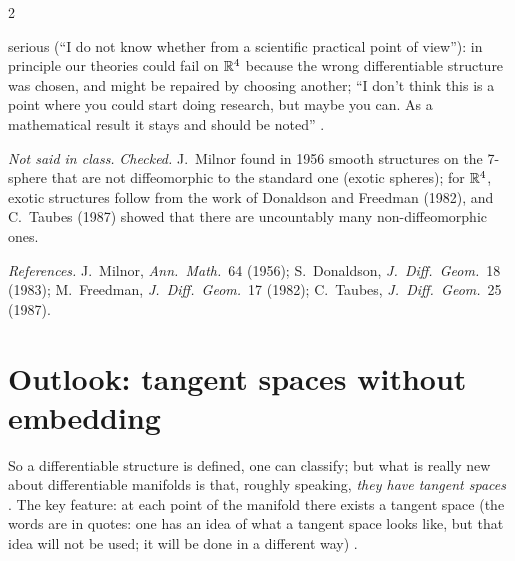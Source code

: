 \begin{paracol}{2}
\begin{application}
serious (``I do not know whether from a scientific practical point of view''): in principle our theories could fail on $\mathbb{R}^4$ because the wrong differentiable structure was chosen, and might be repaired by choosing another; ``I don't think this is a point where you could start doing research, but maybe you can. As a mathematical result it stays
and should be noted'' .
\end{application}
\begin{history}
\emph{Not said in class.} \emph{Checked.} J.~Milnor found in 1956 smooth structures on the 7-sphere that are not diffeomorphic to the standard one (exotic spheres); for $\mathbb{R}^4$, exotic structures follow from the work of Donaldson and Freedman (1982), and C.~Taubes (1987) showed that there are uncountably many
non-diffeomorphic ones.\par
\emph{References.} J.~Milnor, \emph{Ann.\ Math.}\ 64 (1956); S.~Donaldson, \emph{J.\ Diff.\ Geom.}\ 18 (1983); M.~Freedman, \emph{J.\ Diff.\ Geom.}\ 17 (1982); C.~Taubes, \emph{J.\ Diff.\ Geom.}\ 25 (1987).
\end{history}

\section{Outlook: tangent spaces without embedding}\label{sec:df-outlook}

So a differentiable structure is defined, one can classify; but what is really new about differentiable manifolds is that, roughly speaking, \emph{they have tangent spaces} . The key feature: at each point of the manifold there exists a tangent space (the words are in quotes: one has an idea of what a tangent space looks like,
but that idea will not be used; it will be done in a different way) .


\end{paracol}
